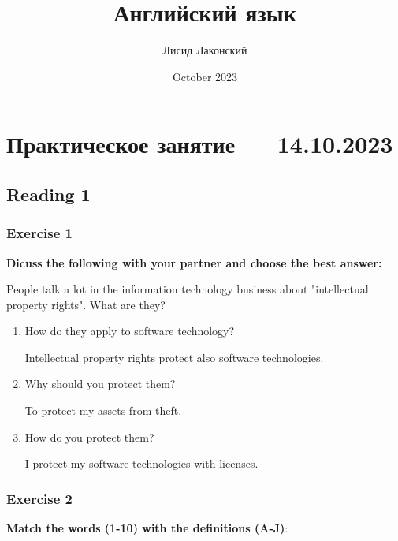 \documentclass{article}
\title{Английский язык}
\author{Лисид Лаконский}
\date{October 2023}
\begin{document}
\raggedright

\maketitle

\tableofcontents
\pagebreak

\section{Практическое занятие — 14.10.2023}

\subsection{Reading 1}

\subsubsection{Exercise 1}

\textbf{Dicuss the following with your partner and choose the best answer:}

People talk a lot in the information technology business about "intellectual property rights". What are they?

\begin{enumerate}
    \item How do they apply to software technology?
    
    Intellectual property rights protect also software technologies.
    \item Why should you protect them?
    
    To protect my assets from theft.
    \item How do you protect them?
    
    I protect my software technologies with licenses.
\end{enumerate}

\subsubsection{Exercise 2}

\textbf{Match the words (1-10) with the definitions (A-J)}:
\end{document}
